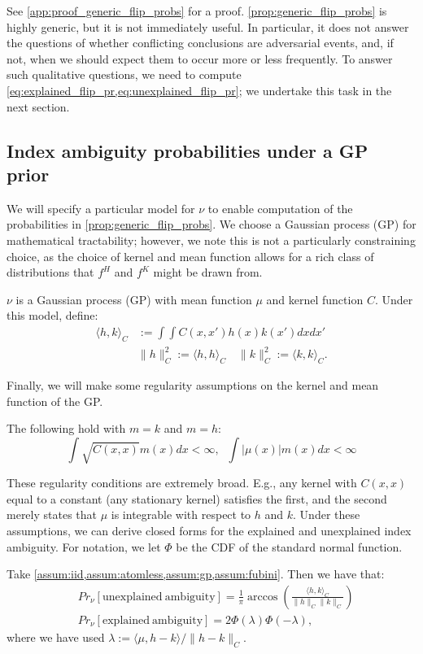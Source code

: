 See \cref{app:proof_generic_flip_probs} for a proof.
\cref{prop:generic_flip_probs} is highly generic, but it is not immediately useful.
In particular, it does not answer the questions of whether conflicting conclusions are adversarial events, and, if not, when we should expect them to occur more or less frequently.
To answer such qualitative questions, we need to compute \cref{eq:explained_flip_pr,eq:unexplained_flip_pr}; we undertake this task in the next section.

\subsection{Index ambiguity probabilities under a GP prior}
\label{sec:gp_sign_flips}
We will specify a particular model for $\nu$ to enable computation of the probabilities in \cref{prop:generic_flip_probs}.
We choose a Gaussian process (GP) for mathematical tractability; however, we note this is not a particularly constraining choice, as the choice of kernel and mean function allows for a rich class of distributions that $f^H$ and $f^K$ might be drawn from.
\begin{assumption} \label{assum:gp}
	$\nu$ is a Gaussian process (GP) with mean function $\mu$ and kernel function $C$. Under this model, define:
	\begin{align*}
		 \langle h, k \rangle_C &:= \int\int C(x,x') h(x) k(x') dx dx' \\
		& \| h \|_C^2 := \langle h, h \rangle_C \quad \| k \|_C^2 := \langle k, k \rangle_C.
	\end{align*}
\end{assumption}
Finally, we will make some regularity assumptions on the kernel and mean function of the GP.
\begin{assumption} \label{assum:fubini}
	The following hold with $m = k$ and $m = h$:
	\begin{equation}
		\int \sqrt{C(x,x)} m(x) dx < \infty, \;\; \int | \mu(x) | m(x) dx < \infty
	\end{equation}
\end{assumption}
These regularity conditions are extremely broad.
E.g., any kernel with $C(x,x)$ equal to a constant (any stationary kernel) satisfies the first, and the second merely states that $\mu$ is integrable with respect to $h$ and $k$.
Under these assumptions, we can derive closed forms for the explained and unexplained index ambiguity.
For notation, we let $\Phi$ be the CDF of the standard normal function.
\begin{proposition} \label{prop:sign_flip_gp}
	Take \cref{assum:iid,assum:atomless,assum:gp,assum:fubini}. Then we have that:
	\begin{align}
		&Pr_\nu[\mathrm{unexplained\ ambiguity}] = \frac{1}{\pi} \arccos\left(\frac{\langle h, k \rangle_C}{\| h \|_C \| k \|_C} \right) \label{eq:unexplained_flip_pr_gp} \\
		&Pr_\nu[\mathrm{explained\ ambiguity}] = 2 \Phi (\lambda) \Phi(-\lambda), \label{eq:explained_flip_pr_gp}
	\end{align}
	where we have used $\lambda := \langle \mu, h-k \rangle / \|h -k\|_C$.
\end{proposition}	
